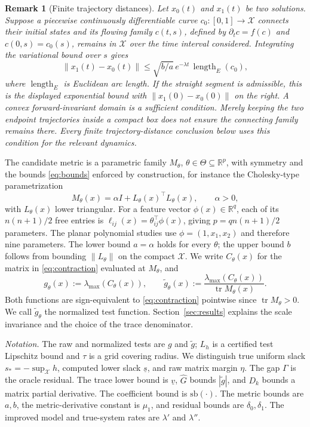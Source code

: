\documentclass[12pt,onecolumn,journal]{IEEEtran}
\newtheorem{remark}{Remark}
\newcommand{\R}{\mathbb{R}}
\newcommand{\X}{\mathcal{X}}
\newcommand{\lmax}{\lambda_{\max}}
\providecommand{\tr}{}
\renewcommand{\tr}{\operatorname{tr}}
\begin{document}
\begin{remark}[Finite trajectory distances]
\label{rem:finite}
Let $x_0(t)$ and $x_1(t)$ be two solutions. Suppose a piecewise continuously differentiable curve $c_0:[0,1]\to\X$ connects their initial states and its flowing family $c(t,s)$, defined by $\partial_t c=f(c)$ and $c(0,s)=c_0(s)$, remains in $\X$ over the time interval considered. Integrating the variational bound over $s$ gives
\[
\|x_1(t)-x_0(t)\| \le \sqrt{b/a}\,e^{-\lambda t}\,\operatorname{length}_{E}(c_0),
\]
where $\operatorname{length}_{E}$ is Euclidean arc length. If the straight segment is admissible, this is the displayed exponential bound with $\|x_1(0)-x_0(0)\|$ on the right. A convex forward-invariant domain is a sufficient condition. Merely keeping the two endpoint trajectories inside a compact box does not ensure the connecting family remains there. Every finite trajectory-distance conclusion below uses this condition for the relevant dynamics.
\end{remark}

The candidate metric is a parametric family $M_\theta$, $\theta \in \Theta \subseteq \R^p$, with symmetry and the bounds \eqref{eq:bounds} enforced by construction, for instance the Cholesky-type parametrization
\begin{equation}
M_\theta(x) = \alpha I + L_\theta(x)^\top L_\theta(x), \qquad \alpha > 0,
\label{eq:class}
\end{equation}
with $L_\theta(x)$ lower triangular. For a feature vector $\phi(x)\in\R^q$, each of its $n(n+1)/2$ free entries is $\ell_{ij}(x)=\theta_{ij}^{\top}\phi(x)$, giving $p=q n(n+1)/2$ parameters. The planar polynomial studies use $\phi=(1,x_1,x_2)$ and therefore nine parameters. The lower bound $a = \alpha$ holds for every $\theta$; the upper bound $b$ follows from bounding $\|L_\theta\|$ on the compact $\X$. We write $C_\theta(x)$ for the matrix in \eqref{eq:contraction} evaluated at $M_\theta$, and
\begin{equation}
g_\theta(x) := \lmax(C_\theta(x)),
\qquad
\tilde g_\theta(x) := \frac{\lmax(C_\theta(x))}{\tr M_\theta(x)}.
\label{eq:tests}
\end{equation}
Both functions are sign-equivalent to \eqref{eq:contraction} pointwise since $\tr M_\theta > 0$. We call $\tilde g_\theta$ the normalized test function. Section~\ref{sec:results} explains the scale invariance and the choice of the trace denominator.

\noindent\textit{Notation.} The raw and normalized tests are $g$ and $\tilde g$; $L_h$ is a certified test Lipschitz bound and $\tau$ is a grid covering radius. We distinguish true uniform slack $s_*=-\sup_\X h$, computed lower slack $\underline s$, and raw matrix margin $\eta$. The gap $\Gamma$ is the oracle residual. The trace lower bound is $\underline v$, $\widehat G$ bounds $|\tilde g|$, and $D_k$ bounds a matrix partial derivative. The coefficient bound is $\mathrm{sb}(\cdot)$. The metric bounds are $a,b$, the metric-derivative constant is $\mu_1$, and residual bounds are $\delta_0,\delta_1$. The improved model and true-system rates are $\lambda'$ and $\lambda''$.
\end{document}
